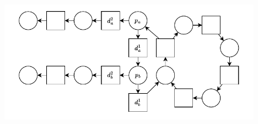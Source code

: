\begin{figure}
    \centering
    \includegraphics{data/prisoners_dilemma.pdf}
    \caption[Prisoner's dilemma in simultaneous-donors model]{}
    \label{fig:prisoners_dilemma}
\end{figure}


